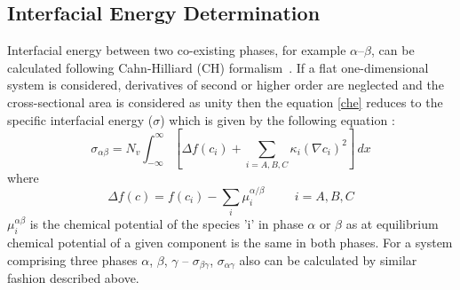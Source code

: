\documentclass[12pt]{iiscthes}
\theoremstyle{definition}
\theoremstyle{definition}
\theoremstyle{remark}
\begin{document}
\begin{appendices}
\chapter{Interfacial Energy Determination}\label{ied}
Interfacial energy between two co-existing phases, for example $\alpha$--$\beta$, can be calculated following Cahn-Hilliard (CH) formalism~\cite{Cahn}. If a flat one-dimensional system is considered, derivatives of second or higher order are neglected and the cross-sectional area is considered as unity then the equation \ref{che} reduces to the specific interfacial energy ($\sigma$) which is given by the following equation : 
\begin{equation}\label{ge1}
\sigma_{\alpha\beta} = N_v \int_{-\infty}^{\infty}\left[\Delta f(c_i) + \sum_{i=A,B,C}\kappa_{i}\left(\nabla c_i\right)^2 \right]\, dx 
\end{equation}  
where
\begin{equation}\label{ge2}
\Delta f(c) = f(c_i) - \sum_i \mu_i^{\alpha/\beta} \hspace{1cm} i = A, B, C
\end{equation}
$\mu_i^{\alpha\beta}$ is the chemical potential of the species 'i' in phase $\alpha$ or $\beta$ as at equilibrium chemical potential of a given component is the same in both phases. For a system comprising three phases $\alpha $, $\beta $, $\gamma $ -- $ \sigma_{\beta\gamma }$,  $ \sigma_{\alpha\gamma}$ also can be calculated by similar fashion described above.
\end{appendices}
\end{document}
